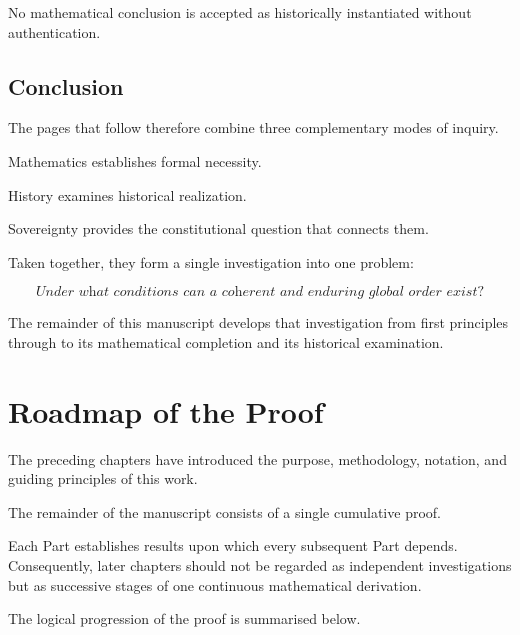 \documentclass[11pt,openany]{book}
\theoremstyle{plain}
\theoremstyle{definition}
\begin{document}
No mathematical conclusion is accepted as historically instantiated without authentication.


\section*{Conclusion}

The pages that follow therefore combine three complementary modes of inquiry.

Mathematics establishes formal necessity.

History examines historical realization.

Sovereignty provides the constitutional question that connects them.

Taken together, they form a single investigation into one problem:

\[
\boxed{
\textit{
Under what conditions can a coherent and enduring global order exist?
}
}
\]

The remainder of this manuscript develops that investigation from first principles through to its mathematical completion and its historical examination.
\chapter*{Roadmap of the Proof}


The preceding chapters have introduced the purpose, methodology, notation, and guiding principles of this work.

The remainder of the manuscript consists of a single cumulative proof.

Each Part establishes results upon which every subsequent Part depends. Consequently, later chapters should not be regarded as independent investigations but as successive stages of one continuous mathematical derivation.

The logical progression of the proof is summarised below.
\end{document}
